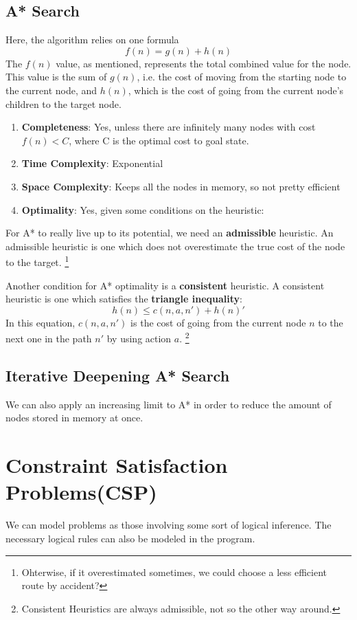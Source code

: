 \documentclass{tufte-handout}
\begin{document}
\subsection{A* Search}
Here, the algorithm relies on one formula
\begin{equation}
	f(n) = g(n) + h(n)
\end{equation}
The $f(n)$ value, as mentioned, represents the total combined value for the node.
This value is the sum of $g(n)$, i.e. the cost of moving from the starting node to the current node,
	and $h(n)$, which is the cost of going from the current node's children to the target node.
\begin{enumerate}
	\item \textbf{Completeness}: Yes, unless there are infinitely many nodes with cost $f(n)<C$, where C is the 
		optimal cost to goal state.
	\item \textbf{Time Complexity}: Exponential
	\item \textbf{Space Complexity}: Keeps all the nodes in memory, so not pretty efficient
	\item \textbf{Optimality}: Yes, given some conditions on the heuristic:
\end{enumerate}
For A* to really live up to its potential, we need an \textbf{admissible} heuristic. 
An admissible heuristic is one which does not overestimate the true cost of the node to the target.
\footnote{Ohterwise, if it overestimated sometimes, we could choose a less efficient route by accident?}

Another condition for A* optimality is a \textbf{consistent} heuristic. A consistent heuristic is one which
satisfies the \textbf{triangle inequality}:
\begin{equation}
	 h(n) \leq c(n,a,n') + h(n)'
\end{equation}
In this equation, $c(n,a,n')$ is the cost of going from the current node $n$ 
	to the next one in the path $n'$ by using action $a$.
\footnote{Consistent Heuristics are always admissible, not so the other way around.}

\subsection{Iterative Deepening A* Search}
We can also apply an increasing limit to A* in order to reduce the amount of nodes stored in memory at once.

\section{Constraint Satisfaction Problems(CSP)}
We can model problems as those involving some sort of logical inference. 
The necessary logical rules can also be modeled in the  program. 
\end{document}
